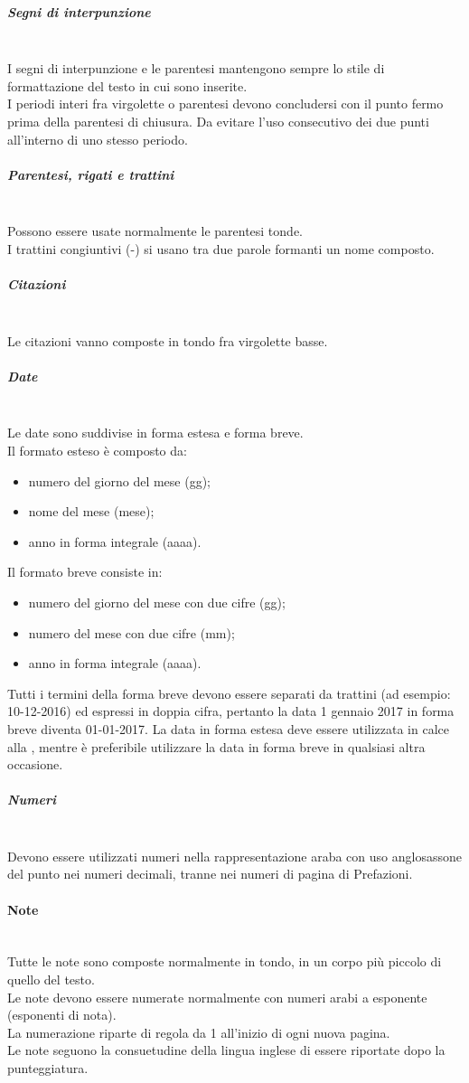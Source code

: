 \subparagraph{Segni di interpunzione} \mbox{} \\
I segni di interpunzione e le parentesi mantengono sempre lo stile di formattazione del testo in cui sono inserite.\\
I periodi interi fra virgolette o parentesi devono concludersi con il punto fermo prima della parentesi di chiusura.
Da evitare l’uso consecutivo dei due punti all'interno di uno stesso periodo.

\subparagraph{Parentesi, rigati e trattini} \mbox{} \\
Possono essere usate normalmente le parentesi tonde.\\
I trattini congiuntivi (-) si usano tra due parole formanti un nome composto.

\subparagraph{Citazioni} \mbox{} \\
Le citazioni vanno composte in tondo fra virgolette basse.

\subparagraph{Date} \mbox{} \\
Le date sono suddivise in forma estesa e forma breve.\\
Il formato esteso è composto da:
\begin{itemize}
	\item numero del giorno del mese (gg);
	\item nome del mese (mese);
	\item anno in forma integrale (aaaa).
\end{itemize}
Il formato breve consiste in:
\begin{itemize}
	\item numero del giorno del mese con due cifre (gg);
	\item numero del mese con due cifre (mm);
	\item anno in forma integrale (aaaa).
\end{itemize}
Tutti i termini della forma breve devono essere separati da trattini (ad esempio: 10-12-2016) ed espressi in doppia cifra, pertanto la data 1 gennaio 2017 in forma breve diventa 01-01-2017.
La data in forma estesa deve essere utilizzata in calce alla \LetteraPresentazione, mentre è preferibile utilizzare la data in forma breve in qualsiasi altra occasione.

\subparagraph{Numeri} \mbox{} \\
Devono essere utilizzati numeri nella rappresentazione araba con uso anglosassone del punto nei numeri decimali, tranne nei numeri di pagina di Prefazioni.

\paragraph{Note}\mbox{}\\
Tutte le note sono composte normalmente in tondo, in un corpo più piccolo di quello del testo.\\
Le note devono essere numerate normalmente con numeri arabi a esponente (esponenti di nota).\\
La numerazione riparte di regola da 1 all'inizio di ogni nuova pagina.\\
Le note seguono la consuetudine della lingua inglese di essere riportate dopo la punteggiatura.

